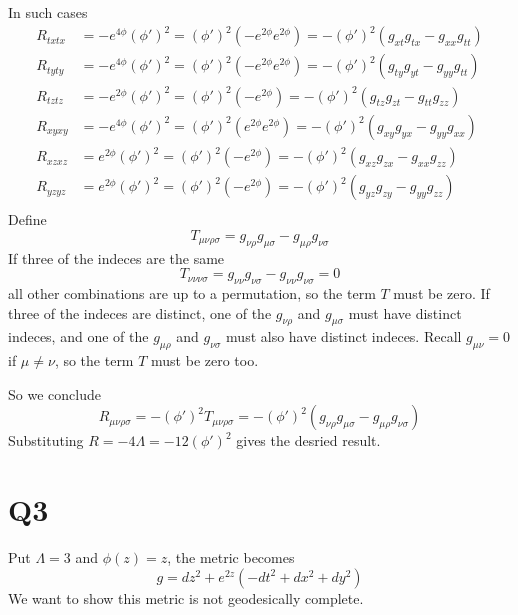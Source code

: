 \documentclass{article}
\theoremstyle{definition}
\theoremstyle{definition}
\theoremstyle{remark}
\begin{document}
In such cases
\begin{align*}
	R_{txtx} &= - e^{4\phi}(\phi')^2 = (\phi')^2 (-e^{2\phi} e^{2\phi}) = -(\phi')^2 (g_{xt}g_{tx} - g_{xx} g_{tt} ) \\
	R_{tyty} &= - e^{4\phi}(\phi')^2 = (\phi')^2 (-e^{2\phi} e^{2\phi}) = -(\phi')^2 (g_{ty}g_{yt}- g_{yy} g_{tt} ) \\
	R_{tztz} &= - e^{2\phi}(\phi')^2 = (\phi')^2 (-e^{2\phi}) = -(\phi')^2 (g_{tz}g_{zt}- g_{tt} g_{zz} ) \\
	R_{xyxy} &= - e^{4\phi}(\phi')^2 = (\phi')^2 (e^{2\phi} e^{2\phi}) = -(\phi')^2 (g_{xy}g_{yx}- g_{yy} g_{xx} ) \\
	R_{xzxz} &= e^{2\phi}(\phi')^2 = (\phi')^2 (-e^{2\phi}) = -(\phi')^2 (g_{xz}g_{zx}- g_{xx} g_{zz} ) \\
	R_{yzyz} &= e^{2\phi}(\phi')^2 = (\phi')^2 (-e^{2\phi}) = -(\phi')^2 (g_{yz}g_{zy}- g_{yy} g_{zz} ) \\
\end{align*}
Define 
$$
	T_{\mu \nu \rho \sigma} = g_{\nu \rho} g_{\mu \sigma} - g_{\mu \rho} g_{\nu \sigma}
$$
If three of the indeces are the same  
$$
T_{\nu \nu \nu \sigma} = g_{\nu \nu} g_{\nu \sigma} - g_{\nu \nu} g_{\nu \sigma} = 0
$$
all other combinations are up to a permutation, so the term $T$ must be zero.
If three of the indeces are distinct, one of the $g_{\nu \rho}$ and $g_{\mu \sigma}$ must have distinct indeces, and one of the $g_{\mu\rho}$ and $g_{\nu \sigma}$ must also have distinct indeces. 
Recall $g_{\mu \nu} = 0$ if $\mu \neq \nu$, so the term $T$ must be zero too.

So we conclude 
$$
R_{\mu \nu \rho \sigma} = -(\phi')^2 T_{\mu \nu \rho \sigma} = -(\phi')^2 (g_{\nu \rho} g_{\mu \sigma} - g_{\mu \rho} g_{\nu \sigma})
$$
Substituting $R = -4 \Lambda = -12 (\phi')^2$ gives the desried result.

\section*{Q3}

Put $\Lambda = 3$ and $\phi(z) = z$, the metric becomes 
$$
g = dz^2 + e^{2z}(-dt^2 + dx^2 + dy^2)
$$
We want to show this metric is not geodesically complete.
\end{document}
